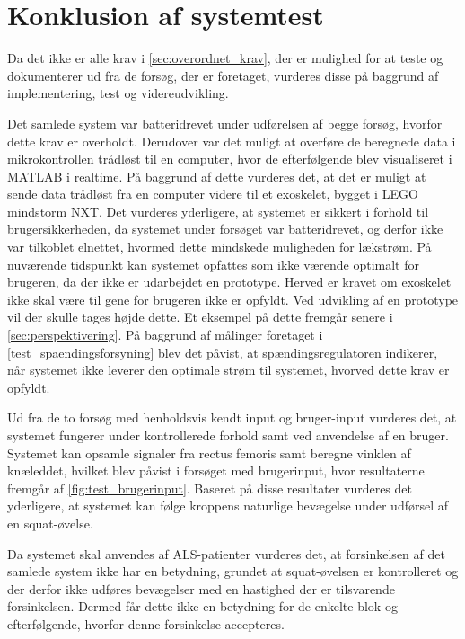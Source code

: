 \section{Konklusion af systemtest}
Da det ikke er alle krav i \autoref{sec:overordnet_krav}, der er mulighed for at teste og dokumenterer ud fra de forsøg, der er foretaget, vurderes disse på baggrund af implementering, test og videreudvikling. 

Det samlede system var batteridrevet under udførelsen af begge forsøg, hvorfor dette krav er overholdt. Derudover var det muligt at overføre de beregnede data i mikrokontrollen trådløst til en computer, hvor de efterfølgende blev visualiseret i MATLAB i realtime. På baggrund af dette vurderes det, at det er muligt at sende data trådløst fra en computer videre til et exoskelet, bygget i LEGO mindstorm NXT. Det vurderes yderligere, at systemet er sikkert i forhold til brugersikkerheden, da systemet under forsøget var batteridrevet, og derfor ikke var tilkoblet elnettet, hvormed dette mindskede muligheden for lækstrøm. 
På nuværende tidspunkt kan systemet opfattes som ikke værende optimalt for brugeren, da der ikke er udarbejdet en prototype. Herved er kravet om exoskelet ikke skal være til gene for brugeren ikke er opfyldt. Ved udvikling af en prototype vil der skulle tages højde dette. Et eksempel på dette fremgår senere i \autoref{sec:perspektivering}. 
På baggrund af målinger foretaget i \autoref{test_spaendingsforsyning} blev det påvist, at spændingsregulatoren indikerer, når systemet ikke leverer den optimale strøm til systemet, hvorved dette krav er opfyldt. 

Ud fra de to forsøg med henholdsvis kendt input og bruger-input vurderes det, at systemet fungerer under kontrollerede forhold samt ved anvendelse af en bruger. Systemet kan opsamle signaler fra rectus femoris samt beregne vinklen af knæleddet, hvilket blev påvist i forsøget med brugerinput, hvor resultaterne fremgår af \autoref{fig:test_brugerinput}. Baseret på disse resultater vurderes det yderligere, at systemet kan følge kroppens naturlige bevægelse under udførsel af en squat-øvelse. 

Da systemet skal anvendes af ALS-patienter vurderes det, at forsinkelsen af det samlede system ikke har en betydning, grundet at squat-øvelsen er kontrolleret og der derfor ikke udføres bevægelser med en hastighed der er tilsvarende forsinkelsen. Dermed får dette ikke en betydning for de enkelte blok og efterfølgende, hvorfor denne forsinkelse accepteres. 

